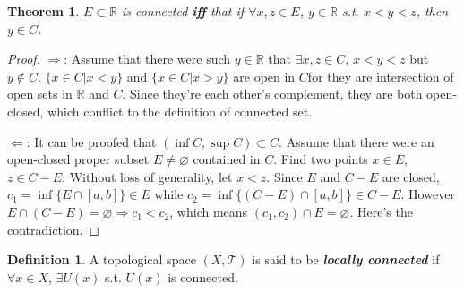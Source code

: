 \documentclass[openany]{book}
\newcommand*{\indexbf}[1]{\emph{\textbf{#1}}\index{#1}} %
\theoremstyle{plain}
\newtheorem{theorem}{Theorem}[section] %
\theoremstyle{definition}
\newtheorem{definition}{Definition}[section] %
\newcommand{\emphbf}[1]{\emph{\textbf{#1}}}
\begin{document}
\begin{theorem}\label{R_connected}
$E\subset\mathbb{R}$ is connected \emphbf{iff} that if $\forall x,z\in E$, $y\in\mathbb{R}$ s.t. $x<y<z$, then $y\in C$.
\end{theorem}
\begin{proof}
	$\Rightarrow$: Assume that there were such $y\in\mathbb{R}$ that $\exists x,z\in C$, $x<y<z$ but $y\notin C$. $\{x\in C|x<y\}$ and $\{x\in C|x>y\}$ are open in $C$for they are intersection of open sets in $\mathbb{R}$ and $C$. Since they're each other's complement, they are both open-closed, which conflict to the definition of connected set.
	
	$\Leftarrow$: It can be proofed that $(\inf C,\sup C)\subset C$. Assume that there were an open-closed proper subset $E\neq\varnothing$ contained in $C$. Find two points $x\in E$, $z\in C - E$. Without loss of generality, let $x<z$. Since $E$ and $C-E$ are closed, $c_1=\inf \{E\cap \left[a,b\right]\}\in E$ while $c_2=\inf \{(C-E)\cap [a,b]\}\in C-E$. However $E\cap(C-E)=\varnothing\Rightarrow c_1<c_2$, which means $(c_1,c_2)\cap E=\varnothing$. Here's the contradiction.
\end{proof}
\begin{definition}\label{locally_connected}
A topological space $( X, \mathscr{T})$ is said to be \indexbf{locally connected} if $\forall x \in X$, $\exists U( x) $ s.t. $U( x)$ is connected.
\end{definition}
\end{document}
